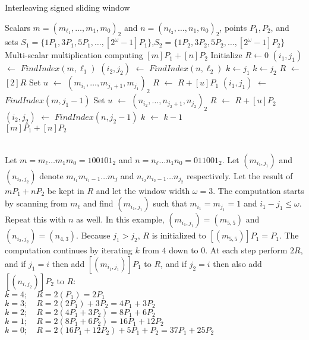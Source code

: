 \begin{algorithm}
\caption{Interleaving signed sliding window}
\begin{algorithmic}
	\Require Scalars $m={(m_{\ell_1},\dots,m_1,m_0)}_2$ and $n={(n_{\ell_2},\dots,n_1,n_0)}_2$,
		points $P_1,P_2$, and sets $S_1=\{1P_1,3P_1,5P_1,\dots,[2^{\omega}-1]P_1\}$,$S_2=\{1P_2,3P_2,5P_2,\dots,[2^{\omega}-1]P_2\}$
	\Ensure Multi-scalar multiplication computing $[m]P_1 + [n]P_2$
	\Statex
	\State Initialize $R \gets 0$
	\State $(i_1,j_1)$ $\gets$ $FindIndex(m,\ell_1)$		
	\State $(i_2,j_2)$ $\gets$ $FindIndex(n,\ell_2)$		
	 \State $k \gets j_1$
	\Else \State $k \gets j_2$
	\EndIf
		\State $R$ $\gets$ $[2]R$
			\State Set $u$ $\gets$ ${(m_{i_1},\dots,m_{j_1+1},m_{j_1})}_2$
			\State $R$ $\gets$ $R + [u]P_1$		
			\State $(i_1,j_1)$ $\gets$ $FindIndex(m,j_1{-}1)$
		\EndIf
			\State Set $u$ $\gets$ ${(n_{i_2},\dots,n_{j_2+1},n_{j_2})}_2$
			\State $R$ $\gets$ $R + [u]P_2$		
			\State $(i_2,j_2)$ $\gets$ $FindIndex(n,j_2{-}1)$
		\EndIf
		\State $k$ $\gets$ $k - 1$
	\EndWhile
	\\ \Return $[m]P_1 + [n]P_2$
\end{algorithmic}
\label{interleaveSlidingAlgo}
\end{algorithm}

 \\
Let $m = m_\ell \dots m_1 m_0 = {100101}_2$ and $n = n_\ell \dots n_1 n_0 = {011001}_2$.
Let $(m_{i_1,j_1})$ and $(n_{i_2,j_2})$ denote $m_{i_1} m_{i_1-1} \dots m_{j}$ and $n_{i_2} n_{i_2-1} \dots n_{j_2}$ respectively.
Let the result of $mP_1 + nP_2$ be kept in $R$ and let the window width $\omega = 3$.
The computation starts by scanning from $m_\ell$ and find $(m_{i_1,j_1})$ such that $m_{i_1} = m_{j_1} = 1$ and $i_1 - j_1 \le \omega$.
Repeat this with $n$ as well.
In this example, $(m_{i_1,j_1}) = (m_{5,5})$ and $(n_{i_2,j_2}) = (n_{4,3})$.
Because $j_1 > j_2$, $R$ is initialized to $[(m_{5,5})]P_1 = P_1$.
The computation continues by iterating $k$ from $4$ down to $0$.
At each step perform $2R$, and if $j_1 = i$ then add $[(m_{i_1,j_1})]P_1$ to $R$, and if $j_2 = i$ then also add $[(n_{i,j_2})]P_2$ to $R$: \\
$k=4; \quad R = 2(P_1) = 2P_1$ \\
$k=3; \quad R = 2(2P_1) + 3P_2 = 4P_1 + 3P_2$ \\
$k=2; \quad R = 2(4P_1 + 3P_2) = 8P_1 + 6P_2$ \\
$k=1; \quad R = 2(8P_1 + 6P_2) = 16P_1 + 12P_2$ \\
$k=0; \quad R = 2(16P_1 + 12P_2) + 5P_1 + P_2 = 37P_1 + 25P_2$ \\


